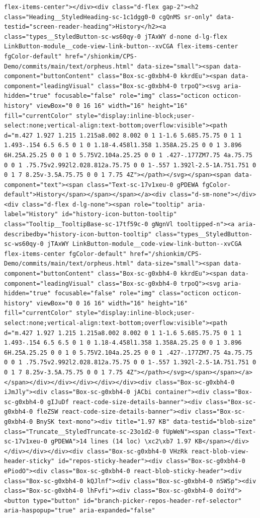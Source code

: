 \documentclass[
  letterpaper,
]{book}
\begin{document}
\begin{verbatim}
flex-items-center"></div><div class="d-flex gap-2"><h2 class="Heading__StyledHeading-sc-1c1dgg0-0 cgQnMS sr-only" data-testid="screen-reader-heading">History</h2><a class="types__StyledButton-sc-ws60qy-0 jTAxWY d-none d-lg-flex LinkButton-module__code-view-link-button--xvCGA flex-items-center fgColor-default" href="/shionkim/CPS-Demo/commits/main/text/orpheus.html" data-size="small"><span data-component="buttonContent" class="Box-sc-g0xbh4-0 kkrdEu"><span data-component="leadingVisual" class="Box-sc-g0xbh4-0 trpoQ"><svg aria-hidden="true" focusable="false" role="img" class="octicon octicon-history" viewBox="0 0 16 16" width="16" height="16" fill="currentColor" style="display:inline-block;user-select:none;vertical-align:text-bottom;overflow:visible"><path d="m.427 1.927 1.215 1.215a8.002 8.002 0 1 1-1.6 5.685.75.75 0 1 1 1.493-.154 6.5 6.5 0 1 0 1.18-4.458l1.358 1.358A.25.25 0 0 1 3.896 6H.25A.25.25 0 0 1 0 5.75V2.104a.25.25 0 0 1 .427-.177ZM7.75 4a.75.75 0 0 1 .75.75v2.992l2.028.812a.75.75 0 0 1-.557 1.392l-2.5-1A.751.751 0 0 1 7 8.25v-3.5A.75.75 0 0 1 7.75 4Z"></path></svg></span><span data-component="text"><span class="Text-sc-17v1xeu-0 gPDEWA fgColor-default">History</span></span></span></a><div class="d-sm-none"></div><div class="d-flex d-lg-none"><span role="tooltip" aria-label="History" id="history-icon-button-tooltip" class="Tooltip__TooltipBase-sc-17tf59c-0 gNgnVl tooltipped-n"><a aria-describedby="history-icon-button-tooltip" class="types__StyledButton-sc-ws60qy-0 jTAxWY LinkButton-module__code-view-link-button--xvCGA flex-items-center fgColor-default" href="/shionkim/CPS-Demo/commits/main/text/orpheus.html" data-size="small"><span data-component="buttonContent" class="Box-sc-g0xbh4-0 kkrdEu"><span data-component="leadingVisual" class="Box-sc-g0xbh4-0 trpoQ"><svg aria-hidden="true" focusable="false" role="img" class="octicon octicon-history" viewBox="0 0 16 16" width="16" height="16" fill="currentColor" style="display:inline-block;user-select:none;vertical-align:text-bottom;overflow:visible"><path d="m.427 1.927 1.215 1.215a8.002 8.002 0 1 1-1.6 5.685.75.75 0 1 1 1.493-.154 6.5 6.5 0 1 0 1.18-4.458l1.358 1.358A.25.25 0 0 1 3.896 6H.25A.25.25 0 0 1 0 5.75V2.104a.25.25 0 0 1 .427-.177ZM7.75 4a.75.75 0 0 1 .75.75v2.992l2.028.812a.75.75 0 0 1-.557 1.392l-2.5-1A.751.751 0 0 1 7 8.25v-3.5A.75.75 0 0 1 7.75 4Z"></path></svg></span></span></a></span></div></div></div></div></div><div class="Box-sc-g0xbh4-0 iJmJly"><div class="Box-sc-g0xbh4-0 jACbi container"><div class="Box-sc-g0xbh4-0 gIJuDf react-code-size-details-banner"><div class="Box-sc-g0xbh4-0 fleZSW react-code-size-details-banner"><div class="Box-sc-g0xbh4-0 BnySK text-mono"><div title="1.97 KB" data-testid="blob-size" class="Truncate__StyledTruncate-sc-23o1d2-0 fUpWeN"><span class="Text-sc-17v1xeu-0 gPDEWA">14 lines (14 loc) \xc2\xb7 1.97 KB</span></div></div></div></div><div class="Box-sc-g0xbh4-0 VHzRk react-blob-view-header-sticky" id="repos-sticky-header"><div class="Box-sc-g0xbh4-0 ePiodO"><div class="Box-sc-g0xbh4-0 react-blob-sticky-header"><div class="Box-sc-g0xbh4-0 kQJlnf"><div class="Box-sc-g0xbh4-0 nSWSp"><div class="Box-sc-g0xbh4-0 lhFvfi"><div class="Box-sc-g0xbh4-0 doiYd"><button type="button" id="branch-picker-repos-header-ref-selector" aria-haspopup="true" aria-expanded="false" 
\end{verbatim}
\end{document}
